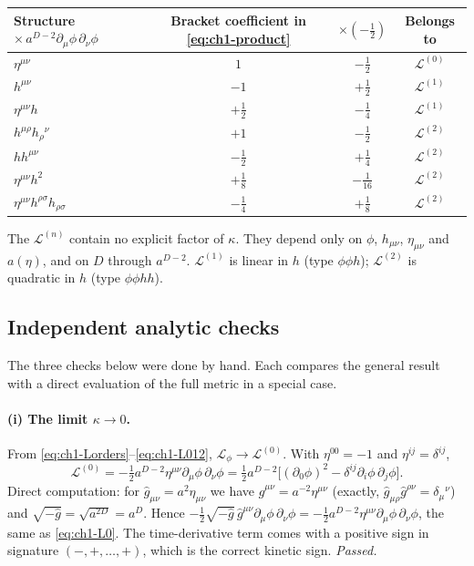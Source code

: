 \begin{center}
\small
\begin{tabular}{lccc}
\toprule
Structure $\times\,a^{D-2}\partial_\mu\phi\,\partial_\nu\phi$ & Bracket coefficient in \eqref{eq:ch1-product} & $\times(-\tfrac12)$ & Belongs to\\
\midrule
$\eta^{\mu\nu}$ & $1$ & $-\tfrac12$ & $\mathcal L^{(0)}$\\
$h^{\mu\nu}$ & $-1$ & $+\tfrac12$ & $\mathcal L^{(1)}$\\
$\eta^{\mu\nu}h$ & $+\tfrac12$ & $-\tfrac14$ & $\mathcal L^{(1)}$\\
$h^{\mu\rho}h_\rho{}^\nu$ & $+1$ & $-\tfrac12$ & $\mathcal L^{(2)}$\\
$hh^{\mu\nu}$ & $-\tfrac12$ & $+\tfrac14$ & $\mathcal L^{(2)}$\\
$\eta^{\mu\nu}h^2$ & $+\tfrac18$ & $-\tfrac1{16}$ & $\mathcal L^{(2)}$\\
$\eta^{\mu\nu}h^{\rho\sigma}h_{\rho\sigma}$ & $-\tfrac14$ & $+\tfrac18$ & $\mathcal L^{(2)}$\\
\bottomrule
\end{tabular}
\end{center}
The $\mathcal L^{(n)}$ contain no explicit factor of $\kappa$. They depend only
on $\phi$, $h_{\mu\nu}$, $\eta_{\mu\nu}$ and $a(\eta)$, and on $D$ through
$a^{D-2}$. $\mathcal L^{(1)}$ is linear in $h$ (type $\phi\phi h$);
$\mathcal L^{(2)}$ is quadratic in $h$ (type $\phi\phi hh$).

\subsection{Independent analytic checks}
\label{sec:ch1-t1-checks}

The three checks below were done by hand. Each compares the general result with
a direct evaluation of the full metric in a special case.

\paragraph{(i) The limit $\kappa\to0$.} From
\eqref{eq:ch1-Lorders}--\eqref{eq:ch1-L012}, $\mathcal L_\phi\to\mathcal L^{(0)}$.
With $\eta^{00}=-1$ and $\eta^{ij}=\delta^{ij}$,
\begin{equation}
\mathcal L^{(0)}=-\tfrac12a^{D-2}\eta^{\mu\nu}\partial_\mu\phi\,\partial_\nu\phi=\tfrac12a^{D-2}\big[(\partial_0\phi)^2-\delta^{ij}\partial_i\phi\,\partial_j\phi\big].
\label{eq:ch1-L0}
\end{equation}
Direct computation: for $\hat g_{\mu\nu}=a^2\eta_{\mu\nu}$ we have
$\hat g^{\mu\nu}=a^{-2}\eta^{\mu\nu}$ (exactly,
$\hat g_{\mu\rho}\hat g^{\rho\nu}=\delta_\mu{}^\nu$) and $\sqrt{-\hat g}=\sqrt{a^{2D}}=a^D$.
Hence
$-\tfrac12\sqrt{-\hat g}\,\hat g^{\mu\nu}\partial_\mu\phi\,\partial_\nu\phi=-\tfrac12a^{D-2}\eta^{\mu\nu}\partial_\mu\phi\,\partial_\nu\phi$,
the same as \eqref{eq:ch1-L0}. The time-derivative term comes with a positive
sign in signature $(-,+,\ldots,+)$, which is the correct kinetic sign.
\emph{Passed.}

